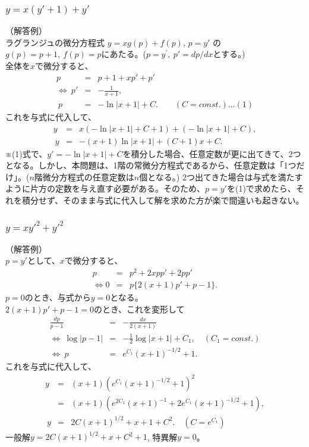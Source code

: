 \documentclass[a4paper,11pt,fleqn]{jarticle}
\begin{document}
\subsubsection{$y=x(y'+1)+y'$}
（解答例）\\
ラグランジュの微分方程式
$ y = xg(p) + f(p)$,
$p = y'$
の$g(p)=p+1,\ f(p)=p$にあたる。($p = y^{\prime}, \  p'=dp/dx $とする。)
\\
全体を$x$で微分すると、
 \begin{eqnarray*}
  p&=& p+1 + xp' + p' \\
  \Leftrightarrow \ p' &=& -\frac{1}{x+1},  \\
  \ p &=& -\ln{|x+1|} + C. \qquad (C=const.) 　…(1)
 \end{eqnarray*}
 これを与式に代入して、
 \begin{eqnarray*}
  y &=& x(- \ln{|x+1|+C+1} )+(- \ln|x+1| +C), \\
  \ y &=& -(x+1)\ln{|x+1|}  + (C+1) x+C.
 \end{eqnarray*}
※(1)式で、$y' = -\ln |x+1| + C$を積分した場合、任意定数が更に出てきて、2つとなる。しかし、本問題は、1階の常微分方程式であるから、任意定数は「1つだけ」。($n$階微分方程式の任意定数は$n$個となる。)
2つ出てきた場合は与式を満たすように片方の定数を与え直す必要がある。そのため、$p = y'$を(1)で求めたら、それを積分せず、そのまま与式に代入して解を求めた方が楽で間違いも起きない。
\subsubsection{$y=x{y'}^2+{y'}^2$}
（解答例）\\
$p=y'$として、$x$で微分すると、
\begin{eqnarray*}
 p &=& p^2 + 2xpp' + 2pp' \\
 \Leftrightarrow 0 &=& p\{ 2(x + 1)p' + p-1 \}.
\end{eqnarray*}
$p=0$のとき、与式から$y=0$となる。\\
$2(x + 1)p' + p-1=0$のとき、これを変形して
\begin{eqnarray*}
 \frac{dp}{p-1} &=& - \frac{dx}{2(x+1)} \\
 \Leftrightarrow \ \log{|p-1|} &=&  -\frac{1}{2}\log{|x+1|} + C_1, \quad (C_1=const.)\\
 \Leftrightarrow \ p &=&  e^{C_1}(x+1)^{-1/2} + 1. 
\end{eqnarray*}
これを与式に代入して、
\begin{eqnarray*}
 y &=& (x+1) (e^{C_1}(x+1)^{-1/2} + 1)^2 \\
 &=& (x+1) (e^{2C_1}(x+1)^{-1} + 2e^{C_1}(x+1)^{-1/2} + 1),\\
 \ y &=& 2C(x+1)^{1/2} + x + 1 + C^2. \quad \left( C=e^{C_1} \right)
\end{eqnarray*}
一般解$y=2C(x+1)^{1/2} + x  +C^2+ 1$, 特異解$y=0$。\\
\end{document}
